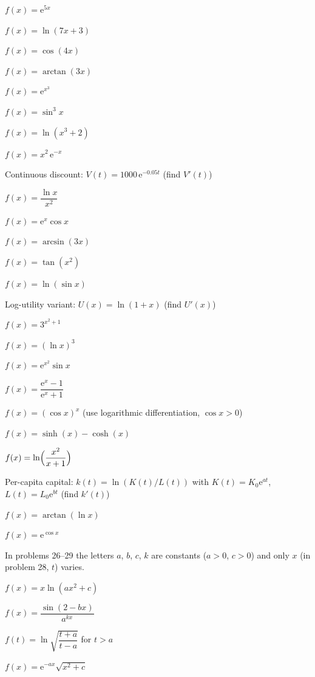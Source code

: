 \begin{problems}
  \item $f(x)=\mathrm{e}^{5x}$
  \item $f(x)=\ln(7x+3)$
  \item $f(x)=\cos(4x)$
  \item $f(x)=\arctan(3x)$
  \item $f(x)=\mathrm{e}^{x^{3}}$
  \item $f(x)=\sin^{3}x$
  \item $f(x)=\ln(x^{3}+2)$
  \item $f(x)=x^{2}\,\mathrm{e}^{-x}$
  \item Continuous discount: $V(t)=1000\,\mathrm{e}^{-0.05t}$ \quad (find
        $V'(t)$)
  \item $f(x)=\dfrac{\ln x}{x^{2}}$
  \item $f(x)=\mathrm{e}^{x}\cos x$
  \item $f(x)=\arcsin(3x)$
  \item $f(x)=\tan(x^{2})$
  \item $f(x)=\ln(\sin x)$
  \item Log-utility variant: $U(x)=\ln(1+x)$ \quad (find $U'(x)$)
  \item $f(x)=3^{x^{2}+1}$
  \item $f(x)=(\ln x)^{3}$
  \item $f(x)=\mathrm{e}^{x^{2}}\sin x$
  \item $f(x)=\dfrac{\mathrm{e}^{x}-1}{\mathrm{e}^{x}+1}$
  \item $f(x)=(\cos x)^{x}$ \quad (use logarithmic differentiation,
        $\cos x>0$)
  \item $f(x)=\sinh(x)-\cosh(x)$
  \item $f(x)=\ln\Bigl(\dfrac{x^{2}}{x+1}\Bigr)$
  \item Per-capita capital: $k(t)=\ln(K(t)/L(t))$ with
        $K(t)=K_{0}\mathrm{e}^{at}$, $L(t)=L_{0}\mathrm{e}^{bt}$ \quad
        (find $k'(t)$)
  \item $f(x)=\arctan(\ln x)$
  \item $f(x)=\mathrm{e}^{\cos x}$
\end{problems}

In problems 26--29 the letters $a$, $b$, $c$, $k$ are constants ($a>0$,
$c>0$) and only $x$ (in problem 28, $t$) varies.

\begin{problems}[resume]
  \item $f(x)=x\ln(ax^{2}+c)$
  \item $f(x)=\dfrac{\sin(2-bx)}{a^{kx}}$
  \item $f(t)=\ln\sqrt{\dfrac{t+a}{t-a}}$ \quad for $t>a$
  \item $f(x)=\mathrm{e}^{-ax}\sqrt{x^{2}+c}$
\end{problems}

